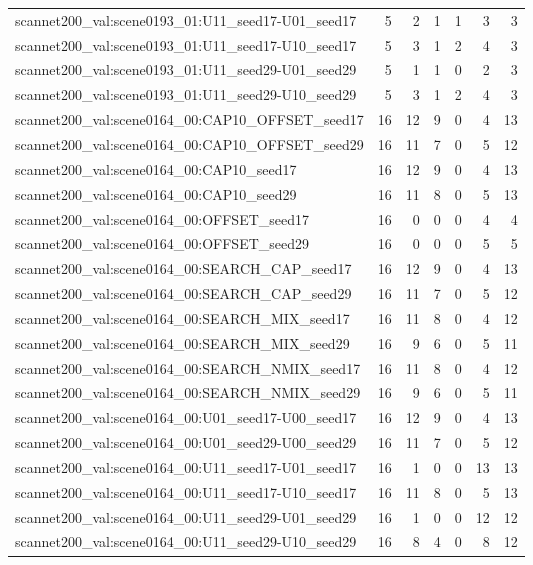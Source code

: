 \begin{table}[t]
\begin{tabular}{lrrrrrr}
scannet200\_val:scene0193\_01:U11\_seed17-U01\_seed17 & 5 & 2 & 1 & 1 & 3 & 3 \\
scannet200\_val:scene0193\_01:U11\_seed17-U10\_seed17 & 5 & 3 & 1 & 2 & 4 & 3 \\
scannet200\_val:scene0193\_01:U11\_seed29-U01\_seed29 & 5 & 1 & 1 & 0 & 2 & 3 \\
scannet200\_val:scene0193\_01:U11\_seed29-U10\_seed29 & 5 & 3 & 1 & 2 & 4 & 3 \\
scannet200\_val:scene0164\_00:CAP10\_OFFSET\_seed17 & 16 & 12 & 9 & 0 & 4 & 13 \\
scannet200\_val:scene0164\_00:CAP10\_OFFSET\_seed29 & 16 & 11 & 7 & 0 & 5 & 12 \\
scannet200\_val:scene0164\_00:CAP10\_seed17 & 16 & 12 & 9 & 0 & 4 & 13 \\
scannet200\_val:scene0164\_00:CAP10\_seed29 & 16 & 11 & 8 & 0 & 5 & 13 \\
scannet200\_val:scene0164\_00:OFFSET\_seed17 & 16 & 0 & 0 & 0 & 4 & 4 \\
scannet200\_val:scene0164\_00:OFFSET\_seed29 & 16 & 0 & 0 & 0 & 5 & 5 \\
scannet200\_val:scene0164\_00:SEARCH\_CAP\_seed17 & 16 & 12 & 9 & 0 & 4 & 13 \\
scannet200\_val:scene0164\_00:SEARCH\_CAP\_seed29 & 16 & 11 & 7 & 0 & 5 & 12 \\
scannet200\_val:scene0164\_00:SEARCH\_MIX\_seed17 & 16 & 11 & 8 & 0 & 4 & 12 \\
scannet200\_val:scene0164\_00:SEARCH\_MIX\_seed29 & 16 & 9 & 6 & 0 & 5 & 11 \\
scannet200\_val:scene0164\_00:SEARCH\_NMIX\_seed17 & 16 & 11 & 8 & 0 & 4 & 12 \\
scannet200\_val:scene0164\_00:SEARCH\_NMIX\_seed29 & 16 & 9 & 6 & 0 & 5 & 11 \\
scannet200\_val:scene0164\_00:U01\_seed17-U00\_seed17 & 16 & 12 & 9 & 0 & 4 & 13 \\
scannet200\_val:scene0164\_00:U01\_seed29-U00\_seed29 & 16 & 11 & 7 & 0 & 5 & 12 \\
scannet200\_val:scene0164\_00:U11\_seed17-U01\_seed17 & 16 & 1 & 0 & 0 & 13 & 13 \\
scannet200\_val:scene0164\_00:U11\_seed17-U10\_seed17 & 16 & 11 & 8 & 0 & 5 & 13 \\
scannet200\_val:scene0164\_00:U11\_seed29-U01\_seed29 & 16 & 1 & 0 & 0 & 12 & 12 \\
scannet200\_val:scene0164\_00:U11\_seed29-U10\_seed29 & 16 & 8 & 4 & 0 & 8 & 12 \\

\end{tabular}
\end{table}
